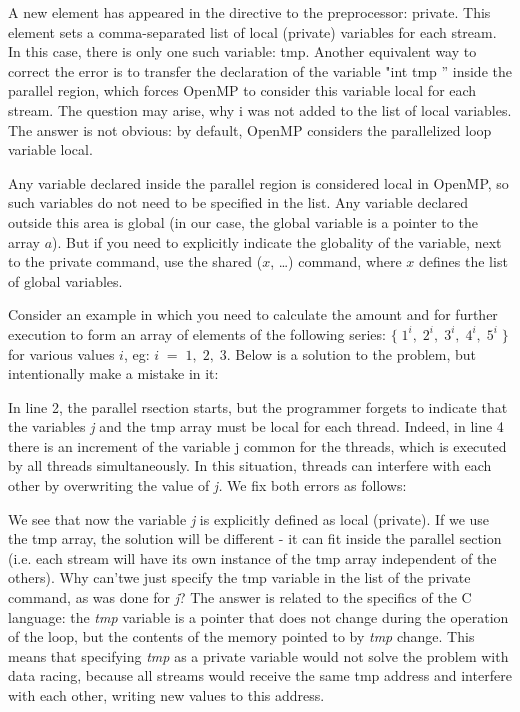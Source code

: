 {	\begin{figure}[H]
		
	\end{figure}
	\par A new element has appeared in the directive to the preprocessor: private. This element sets a comma-separated list of local (private) variables for each stream. In this case, there is only one such variable: tmp. Another equivalent way to correct the error is to transfer the declaration of the variable "int tmp '' inside the parallel region, which forces OpenMP to consider this variable local for each stream. The question may arise, why i was not added to the list of local variables. The answer is not obvious: by default, OpenMP considers the parallelized loop variable local.
	\par Any variable declared inside the parallel region is considered local in OpenMP, so such variables do not need to be specified in the list. Any variable declared outside this area is global (in our case, the global variable is a pointer to the array $a$). But if you need to explicitly indicate the globality of the variable, next to the private command, use the shared ($x$, \ldots) command, where $x$ defines the list of global variables.
	\par Consider an example in which you need to calculate the amount and for further execution to form an array of elements of the following series: $\{\;1^i,\;2^i,\;3^i,\;4^i,\;5^i\;\}$ for various values $i$, eg: $i\;=\;1,\;2,\;3$. Below is a solution to the problem, but intentionally make a mistake in it:
	\begin{figure}[H]
		
	\end{figure}
	\par In line 2, the parallel rsection starts, but the programmer forgets to indicate that the variables\textit{ j} and the tmp array must be local for each thread. Indeed, in line 4 there is an increment of the variable j common for the threads, which is executed by all threads simultaneously. In this situation, threads can interfere with each other by overwriting the value of\textit{ j.} We fix both errors as follows:
	\begin{figure}[H]
		
	\end{figure}
	\par We see that now the variable \textit{j} is explicitly defined as local (private). If we use the tmp array, the solution will be different - it can fit inside the parallel section (i.e. each stream will have its own instance of the tmp array independent of the others). Why can'twe just specify the tmp variable in the list of the private command, as was done for \textit{j}? The answer is related to the specifics of the C language: the \textit{tmp} variable is a pointer that does not change during the operation of the loop, but the contents of the memory pointed to by \textit{tmp }change. This means that specifying \textit{tmp} as a private variable would not solve the problem with data racing, because all streams would receive the same tmp address and interfere with each other, writing new values to this address.
}
